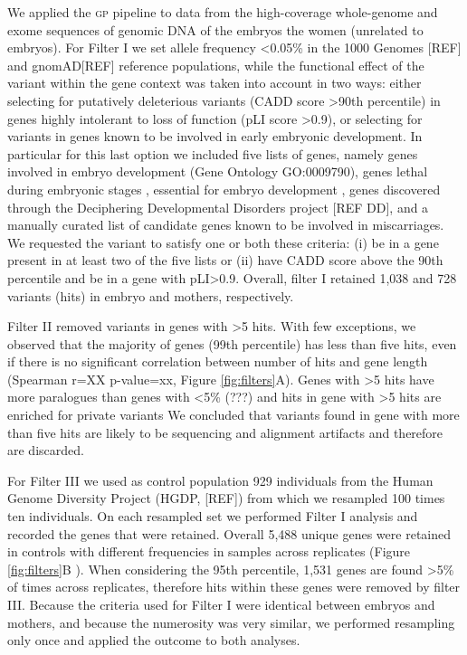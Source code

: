 \documentclass[fleqn,10pt]{wlscirep}
\newcommand{\gp}[]{\textsc{gp }}
\begin{document}
We applied the \gp pipeline to data from the high-coverage whole-genome and exome sequences of genomic DNA of the embryos the women (unrelated to embryos). For Filter I we set allele frequency <0.05\% in the 1000 Genomes [REF] and gnomAD[REF] reference populations, while the functional effect of the variant within the gene context was taken into account in two ways: either selecting for putatively deleterious variants (CADD score >90th percentile) in genes highly intolerant to loss of function (pLI score >0.9), or selecting for variants in genes known to be involved in early embryonic development. In particular for this last option we included five lists of genes, namely genes involved in embryo development (Gene Ontology GO:0009790), genes lethal during embryonic stages \cite{dawes2019gene}, essential for embryo development \cite{dawes2019gene}, genes discovered through the Deciphering Developmental Disorders project [REF DD], and a manually curated list of candidate genes known to be involved in miscarriages. We requested the variant to satisfy one or both these criteria: (i) be in a gene present in at least two of the five lists or (ii) have CADD score above the 90th percentile and be in a gene with pLI>0.9. Overall, filter I retained 1,038 and 728 variants (hits) in embryo and mothers, respectively.   

Filter II removed variants in genes with >5 hits. With few exceptions, we observed that the majority of genes (99th percentile) has less than five hits, even if there is no significant correlation between number of hits and gene length (Spearman r=XX p-value=xx, Figure \ref{fig:filters}A). Genes with >5 hits have more paralogues than genes with <5\% (???) and hits in gene with >5 hits are enriched for private variants  We concluded that variants found in gene with more than five hits are likely to be sequencing and alignment artifacts and therefore are discarded. 

For Filter III we used as control population 929 individuals from the Human Genome Diversity Project (HGDP, [REF]) from which we resampled 100 times ten individuals. On each resampled set we performed Filter I analysis and recorded the genes that were retained. Overall 5,488 unique genes were retained in controls with different frequencies in samples across replicates (Figure \ref{fig:filters}B ). When considering the 95th percentile, 1,531 genes are found >5\% of times across replicates, therefore hits within these genes were removed by filter III. Because the criteria used for Filter I were identical between embryos and mothers, and because the numerosity was very similar, we performed resampling only once and applied the outcome to both analyses.
\end{document}
